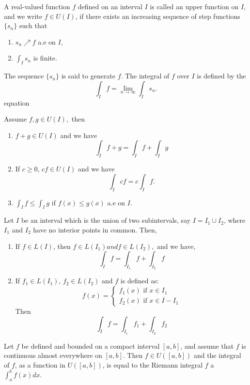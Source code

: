 \documentclass[10pt,a4paper]{book}
\begin{document}
\begin{deff}
A real-valued function $f$ defined on an interval $I$ is called an upper
function on $I$, and we write $f \in U(I)$, if there exists an increasing sequence of step functions $\{s_n\}$ such that

\begin{enumerate}
    \item $s_n \nearrow f$ a.e on $I$,
    \item $\int_I s_n$ is finite.
    
\end{enumerate}
The sequence $\{s_n\}$ is said to generate $f$. The integral of $f$ over $I$ is defined by the
    $$\int_I f = \lim_{n \to \infty} \int_I s_n.$$
equation
\end{deff}
\begin{Thm}
Assume $f,g \in U(I),$ then
\begin{enumerate}
    \item $f+g \in U(I)$ and we have
    $$\int_I f+g = \int_I f + \int_I g$$
    \item If $c \geq 0$, $cf \in U(I)$ and we have
    $$\int_I cf = c \int_I f.$$
    \item $\int_I f \leq \int_I g$ if $f(x) \leq g(x)$ a.e on $I$.
\end{enumerate}
\end{Thm}

\begin{Thm}
 Let $I$ be an interval which is the union of two subintervals, say
$I = I_1 \cup I_2$, where $I_1$ and $I_2$ have no interior points in common. Then,
\begin{enumerate}
    \item If $f\in L(I)$, then $f \in L(I_1) and f \in L(I_2),$ and we have,
    $$\int_I f = \int_{I_1} f + \int_{I_2} f$$
    \item If $f_1 \in L(I_1)$, $f_2 \in L(I_2)$ and $f$ is defined as:
    $$f(x) = \begin{cases}
    f_1(x) \text{ if } x \in I_1 \\
    f_2(x) \text{ if } x \in I - I_1 
    \end{cases} $$
    Then 
    $$\int_I f = \int_{I_1} f_1 + \int_{I_2}f_2$$
\end{enumerate}
\end{Thm}

\begin{Thm}
Let $f$ be defined and bounded on a compact interval $[a, b]$, and
assume that $f$ is continuous almost everywhere on $[a, b]$. Then $f \in U([a, b])$ and the
integral of $f$, as a function in $U([a, b])$, is equal to the Riemann integral $f$ a $\int_a^b f(x) dx.$
\end{Thm}
\end{document}

